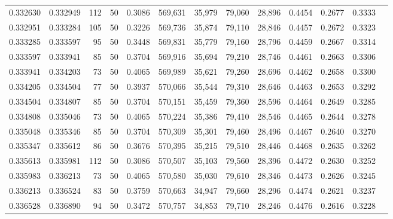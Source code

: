 \begin{tabular}{rrrrrrrrrrrrr}
0.332630 & 0.332949 &   112 &  50 &                                     0.3086 & 569,631 &  35,979 &  79,060 &  28,896 & 0.4454 & 0.2677 & 0.3333 \\
0.332951 & 0.333284 &   105 &  50 &                                     0.3226 & 569,736 &  35,874 &  79,110 &  28,846 & 0.4457 & 0.2672 & 0.3323 \\
0.333285 & 0.333597 &    95 &  50 &                                     0.3448 & 569,831 &  35,779 &  79,160 &  28,796 & 0.4459 & 0.2667 & 0.3314 \\
0.333597 & 0.333941 &    85 &  50 &                                     0.3704 & 569,916 &  35,694 &  79,210 &  28,746 & 0.4461 & 0.2663 & 0.3306 \\
0.333941 & 0.334203 &    73 &  50 &                                     0.4065 & 569,989 &  35,621 &  79,260 &  28,696 & 0.4462 & 0.2658 & 0.3300 \\
0.334205 & 0.334504 &    77 &  50 &                                     0.3937 & 570,066 &  35,544 &  79,310 &  28,646 & 0.4463 & 0.2653 & 0.3292 \\
0.334504 & 0.334807 &    85 &  50 &                                     0.3704 & 570,151 &  35,459 &  79,360 &  28,596 & 0.4464 & 0.2649 & 0.3285 \\
0.334808 & 0.335046 &    73 &  50 &                                     0.4065 & 570,224 &  35,386 &  79,410 &  28,546 & 0.4465 & 0.2644 & 0.3278 \\
0.335048 & 0.335346 &    85 &  50 &                                     0.3704 & 570,309 &  35,301 &  79,460 &  28,496 & 0.4467 & 0.2640 & 0.3270 \\
0.335347 & 0.335612 &    86 &  50 &                                     0.3676 & 570,395 &  35,215 &  79,510 &  28,446 & 0.4468 & 0.2635 & 0.3262 \\
0.335613 & 0.335981 &   112 &  50 &                                     0.3086 & 570,507 &  35,103 &  79,560 &  28,396 & 0.4472 & 0.2630 & 0.3252 \\
0.335983 & 0.336213 &    73 &  50 &                                     0.4065 & 570,580 &  35,030 &  79,610 &  28,346 & 0.4473 & 0.2626 & 0.3245 \\
0.336213 & 0.336524 &    83 &  50 &                                     0.3759 & 570,663 &  34,947 &  79,660 &  28,296 & 0.4474 & 0.2621 & 0.3237 \\
0.336528 & 0.336890 &    94 &  50 &                                     0.3472 & 570,757 &  34,853 &  79,710 &  28,246 & 0.4476 & 0.2616 & 0.3228 \\

\end{tabular}
